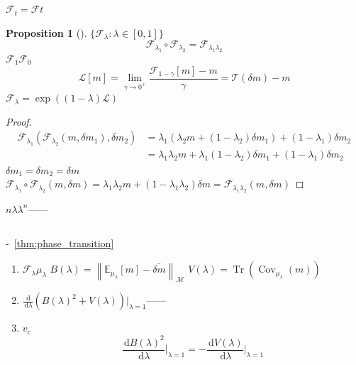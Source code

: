 \documentclass[11pt,a4paper]{article}
\newtheorem{proposition}[theorem]{Proposition}
\theoremstyle{remark}
\DeclareMathOperator{\Cov}{Cov}
\DeclareMathOperator{\Tr}{Tr}
\newcommand{\Mmem}{\mathcal{M}}
\newcommand{\Fforget}{\mathcal{F}}
\newcommand{\E}{\mathbb{E}}
\newcommand{\norm}[1]{\left\lVert#1\right\rVert}
\newcommand{\dd}{\,\mathrm{d}}
\begin{document}
\subsection{}

$\Fforget_t = \Fforget$$t$

\begin{proposition}[]\label{prop:semigroup}
$\{\Fforget_\lambda : \lambda \in [0, 1]\}$
\begin{equation}
    \Fforget_{\lambda_1} \circ \Fforget_{\lambda_2} = \Fforget_{\lambda_1\lambda_2}
\end{equation}
$\Fforget_1$$\Fforget_0$
\textbf{}
\begin{equation}
    \mathcal{L}[m] = \lim_{\gamma \to 0^+} \frac{\Fforget_{1-\gamma}[m] - m}{\gamma}
    = \mathcal{T}(\delta m) - m
\end{equation}
$\Fforget_\lambda = \exp((1-\lambda)\mathcal{L})$
\end{proposition}

\begin{proof}

\begin{align}
    \Fforget_{\lambda_1}(\Fforget_{\lambda_2}(m, \delta m_1), \delta m_2)
    &= \lambda_1(\lambda_2 m + (1-\lambda_2)\delta m_1) + (1-\lambda_1)\delta m_2 \nonumber\\
    &= \lambda_1\lambda_2 m + \lambda_1(1-\lambda_2)\delta m_1 + (1-\lambda_1)\delta m_2
\end{align}
$\delta m_1 = \delta m_2 = \delta m$
$\Fforget_{\lambda_1} \circ \Fforget_{\lambda_2}(m, \delta m) = \lambda_1\lambda_2 m + (1-\lambda_1\lambda_2)\delta m = \Fforget_{\lambda_1\lambda_2}(m, \delta m)$

\end{proof}

\textbf{}
\textbf{}$n$$\lambda$$\lambda^n$——


\subsection{}

-~\ref{thm:phase_transition}


\begin{enumerate}[label=(\arabic*)]
    \item $\Fforget_\lambda$$\mu_\lambda$
          \textbf{}$B(\lambda) = \norm{\E_{\mu_\lambda}[m] - \bar{\delta m}}_{\Mmem}$
          \textbf{}$V(\lambda) = \Tr(\Cov_{\mu_\lambda}(m))$
    \item $\frac{\dd}{\dd \lambda}(B(\lambda)^2 + V(\lambda))\big|_{\lambda=1}$——
          
    \item $v_c$
          \begin{equation}
              \frac{\dd B(\lambda)^2}{\dd \lambda}\Big|_{\lambda=1}
              = -\frac{\dd V(\lambda)}{\dd \lambda}\Big|_{\lambda=1}
          \end{equation}
          
          
\end{enumerate}
\end{document}
